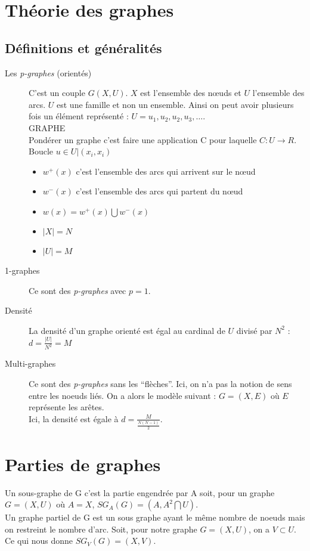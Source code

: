 \section{Théorie des graphes}
\subsection{Définitions et généralités}
\begin{description}
 \item[Les \textit{p-graphes} (orientés)] C'est un couple $G (X,U)$. $X$ est l'ensemble des nœuds et $U$ l'ensemble des arcs. $U$ est une famille et non un ensemble. Ainsi on peut avoir plusieurs fois un élément représenté : $U={u_1, u_2, u_2, u_3, \ldots}$.\\GRAPHE\\Pondérer un graphe c'est faire une application C pour laquelle $C:U\rightarrow R$.\\
 Boucle $u\in U | (x_i, x_i)$ 
 \begin{itemize}
  \item $w^+(x)$ c'est l'ensemble des arcs qui arrivent sur le nœud
  \item $w^-(x)$ c'est l'ensemble des arcs qui partent du nœud
  \item $w(x)=w^{+}(x)\bigcup w^{-}(x)$
  \item $|X|=N$
  \item $|U|=M$
 \end{itemize}
 \item[1-graphes] Ce sont des \textit{p-graphes} avec $p=1$.
 \item[Densité] La densité d'un graphe orienté est égal au cardinal de $U$ divisé par $N^2$ : $d=\frac{|U|}{N^2}=M$
 \item[Multi-graphes] Ce sont des \textit{p-graphes} sans les \enquote{flèches}. Ici, on n'a pas la notion de sens entre les noeuds liés. On a alors le modèle suivant : $G=(X, E)$ où $E$ représente les arêtes.\\Ici, la densité est égale à $d=\frac{M}{\frac{N(N-1)}{2}}$.
\end{description}

\section{Parties de graphes}
Un sous-graphe de G c'est la partie engendrée par A soit, pour un graphe $G=(X,U)$ où $A=X$, $SG_A(G)=(A, A^2\bigcap U)$.\\
Un graphe partiel de G est un sous graphe ayant le même nombre de noeuds mais on restreint le nombre d'arc. Soit, pour notre graphe $G=(X,U)$, on a $V\subset U$. Ce qui nous donne $SG_V(G)=(X,V)$.

